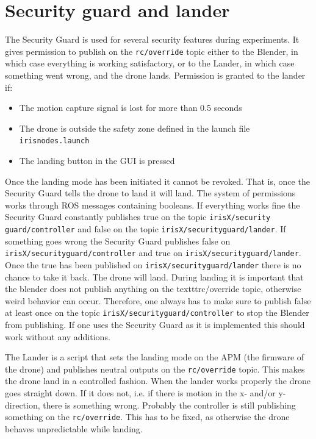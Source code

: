 \documentclass[titlepage,11pt,a4paper]{article}
\begin{document}
\section{Security guard and lander}
\label{sec:security_guard}

The Security Guard is used for several security features during
experiments. It gives permission to publish on the
\texttt{rc/override} topic either to the Blender, in which case
everything is working satisfactory, or to the Lander, in which case
something went wrong, and the drone lands. Permission is granted to the
lander if:
\begin{itemize}
  \item The motion capture signal is lost for more than 0.5 seconds
  \item The drone is outside the safety zone defined in the launch
    file \texttt{iris\textunderscore nodes.launch}
  \item The landing button in the GUI is pressed
\end{itemize}
Once the landing mode has been initiated it cannot be revoked. That
is, once the Security Guard tells the drone to land it will land. The
system of permissions works through ROS messages containing
booleans. If everything works fine the Security Guard constantly
publishes true on the topic \texttt{irisX/security\textunderscore
  guard/controller} and false on the topic
\texttt{irisX/security\textunderscore guard/lander}. If something goes
wrong the Security Guard publishes false on
\texttt{irisX/security\textunderscore guard/controller} and true on
\texttt{irisX/security\textunderscore guard/lander}. Once the true has
been published on \texttt{irisX/security\textunderscore guard/lander}
there is no chance to take it back. The drone will land. During
landing it is important that the blender does not publish anything on
the texttt{rc/override} topic, otherwise weird behavior can
occur. Therefore, one always has to make sure to publish false at least
once on the topic \texttt{irisX/security\textunderscore guard/controller} to
stop the Blender from publishing. If one uses the Security Guard as it
is implemented this should work without any additions.  

The Lander is a script that sets the landing mode on the APM (the
firmware of the drone) and publishes neutral outputs on the
\texttt{rc/override} topic. This makes the drone land in a controlled
fashion. When the lander works properly the drone goes straight
down. If it does not, i.e. if there is motion in the x- and/or
y-direction, there is something wrong. Probably the controller is
still publishing something on the \texttt{rc/override}. This has to be
fixed, as otherwise the drone behaves unpredictable while landing.
\end{document}
